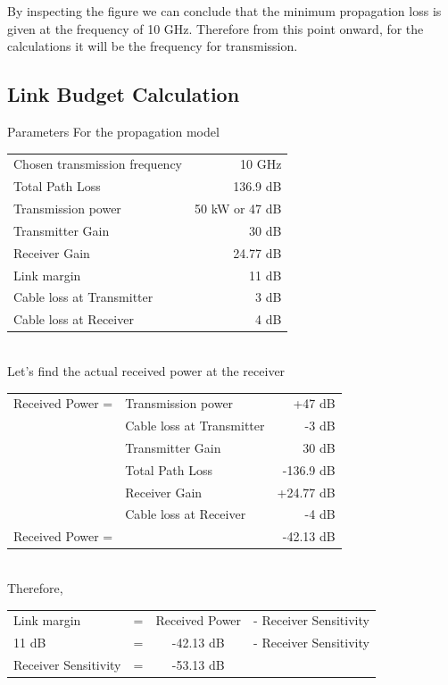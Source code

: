 \documentclass[a4paper,11pt]{article}%
\begin{document}
By inspecting the figure we can conclude that the minimum propagation loss is given at the frequency of 10 GHz. Therefore from this point onward, for the calculations it will be the frequency for transmission.

\subsection{Link Budget Calculation}

Parameters For the propagation model
\begin{tabular}{l r}
Chosen transmission frequency & 10 GHz\\
Total Path Loss & 136.9 dB\\
Transmission power & 50 kW or 47 dB\\
Transmitter Gain & 30 dB\\
Receiver Gain &24.77 dB\\
Link margin  &11 dB\\
Cable loss at Transmitter & 3 dB\\
Cable loss at Receiver &4 dB\\
\end{tabular}\\[1cm]

Let's find the actual received power at the receiver\\

\begin{tabular}{|l l| r|}
	\hline
Received Power =	&Transmission power & +47 dB\\
&	Cable loss at Transmitter & -3 dB\\
&	Transmitter Gain & 30 dB\\
&	Total Path Loss & -136.9 dB\\
&	Receiver Gain &+24.77 dB\\
&	Cable loss at Receiver &-4 dB\\\hline
Received Power =&&-42.13 dB\\\hline\hline
\end{tabular}\\[1cm]


Therefore,\\
\begin{center}
	\begin{tabular}{l c c c}
Link margin  & =& Received Power& - Receiver Sensitivity\\
11 dB& = &-42.13 dB& - Receiver Sensitivity\\
Receiver Sensitivity &= &-53.13 dB& \\\hline\hline
	\end{tabular}
\end{center}
\end{document}
